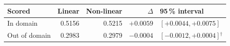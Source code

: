 \begin{tabular}{lrrrl}
\toprule
    \textbf{Scored} & \textbf{Linear} & \textbf{Non-linear} & \textbf{$\Delta$} & \textbf{95\,\% interval} \\
\midrule
    In domain & 0.5156 & 0.5215 & $+0.0059$ & $[+0.0044, +0.0075]$ \\
    Out of domain & 0.2983 & 0.2979 & $-0.0004$ & $[-0.0012, +0.0004]$$^{\dagger}$ \\
\bottomrule
\end{tabular}
